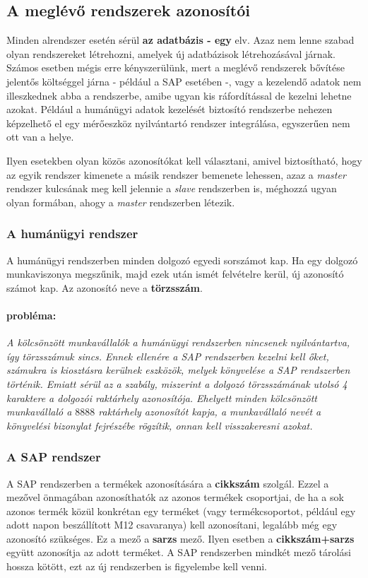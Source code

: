 \documentclass[a4paper,12pt]{report}
\begin{document}
\subsection{A meglévő rendszerek azonosítói}

Minden alrendszer esetén sérül \textbf{az adatbázis - egy} elv. Azaz nem lenne 
szabad olyan rendszereket létrehozni, amelyek új adatbázisok létrehozásával 
járnak. Számos esetben mégis erre kényszerülünk, mert a meglévő rendszerek 
bővítése jelentős költséggel járna - például a SAP esetében -, vagy a kezelendő 
adatok nem illeszkednek abba a rendszerbe, amibe ugyan kis ráfordítással de 
kezelni lehetne azokat. Például a humánügyi adatok kezelését biztosító 
rendszerbe nehezen képzelhető el egy mérőeszköz nyilvántartó rendszer 
integrálása, egyszerűen nem ott van a helye.

Ilyen esetekben olyan közös azonosítókat kell választani, amivel biztosítható,
hogy az egyik rendszer kimenete a másik rendszer bemenete lehessen, azaz a 
\textit{master} rendszer kulcsának meg kell jelennie a \textit{slave} 
rendszerben is, méghozzá ugyan olyan formában, ahogy a \textit{master} 
rendszerben létezik. 

\subsubsection{A humánügyi rendszer}
A humánügyi rendszerben minden dolgozó egyedi sorszámot kap. Ha egy dolgozó 
munkaviszonya megszűnik, majd ezek után ismét felvételre kerül, új azonosító 
számot kap. Az azonosító neve a \textbf{törzsszám}.
\paragraph*{probléma:}
\textit{ 
A kölcsönzött munkavállalók a humánügyi rendszerben nincsenek nyilvántartva, 
így törzsszámuk sincs. Ennek ellenére a SAP rendszerben kezelni kell őket, 
számukra is kiosztásra kerülnek eszközök, melyek könyvelése a SAP rendszerben 
történik. Emiatt sérül az a szabály, miszerint a dolgozó törzsszámának utolsó 4 
karaktere a dolgozói raktárhely azonosítója. Ehelyett minden kölcsönzött 
munkavállaló a $8888$ raktárhely azonosítót kapja, a munkavállaló nevét a 
könyvelési bizonylat fejrészébe rögzítik, onnan kell visszakeresni azokat.
}

\subsubsection{A SAP rendszer}
A SAP rendszerben a termékek azonosítására a \textbf{cikkszám} szolgál. Ezzel a
mezővel önmagában azonosíthatók az azonos termékek csoportjai, de ha a sok 
azonos termék közül konkrétan egy terméket (vagy termékcsoportot, például egy 
adott napon beszállított M12 csavaranya) kell 
azonosítani, legalább még egy azonosító szükséges. Ez a mező a \textbf{sarzs} 
mező. Ilyen esetben a \textbf{cikkszám+sarzs} együtt azonosítja az adott 
terméket. A SAP rendszerben mindkét mező tárolási hossza kötött, ezt az új 
rendszerben is figyelembe kell venni.
\end{document}
